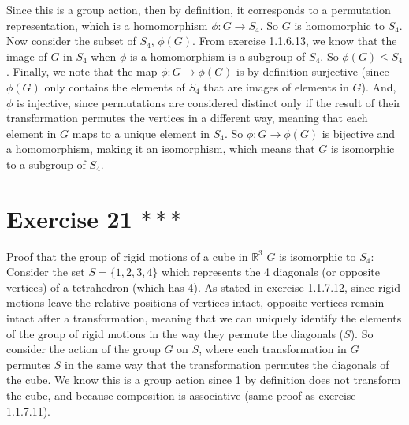 \documentclass{article}
\newcommand{\R}{\mathbb{R}}
\begin{document}
    Since this is a group action, then by definition,
    it corresponds to a permutation representation,
    which is a homomorphism $\phi: G \to S_4$.
    So $G$ is homomorphic to $S_4$. \\
    Now consider the subset of $S_4$, $\phi(G)$.
    From exercise 1.1.6.13, we know that the image of $G$ in $S_4$
    when $\phi$ is a homomorphism is a subgroup of $S_4$.
    So $\phi(G) \leqslant S_4$.
    Finally, we note that the map $\phi: G \to \phi(G)$
    is by definition surjective
    (since $\phi(G)$ only contains the elements of $S_4$ that are images
    of elements in $G$).
    And, $\phi$ is injective, since permutations are considered 
    distinct only if the result of their transformation permutes the
    vertices in a different way,
    meaning that each element in $G$ maps to a unique element in $S_4$.
    So $\phi: G \to \phi(G)$ is bijective and a homomorphism,
    making it an isomorphism,
    which means that $G$ is isomorphic to a subgroup of $S_4$.


    \section*{Exercise 21 $***$}
    Proof that the group of rigid motions of a cube in $\R^3$ $G$
    is isomorphic to $S_4$: \\
    Consider the set $S = \{1, 2, 3, 4\}$ which represents
    the 4 diagonals (or opposite vertices) of a tetrahedron (which has 4).
    As stated in exercise 1.1.7.12,
    since rigid motions leave the relative positions of vertices intact,
    opposite vertices remain intact after a transformation,
    meaning that we can uniquely identify the elements of the group of
    rigid motions in the way they permute the diagonals ($S$).
    So consider the action of the group $G$ on $S$,
    where each transformation in $G$ permutes $S$ in the same way that
    the transformation permutes the diagonals of the cube.
    We know this is a group action since 1 by definition does not transform 
    the cube,
    and because composition is associative
    (same proof as exercise 1.1.7.11). \\
\end{document}
